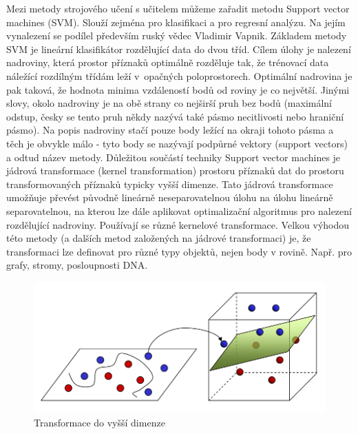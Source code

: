 \documentclass[12pt]{article}
\begin{document}
Mezi metody strojového učení s učitelem můžeme zařadit metodu Support vector machines (SVM). Slouží zejména pro klasifikaci a pro regresní analýzu. Na jejím vynalezení se podílel především ruský vědec Vladimir Vapnik.
Základem metody SVM je lineární klasifikátor rozdělující data do dvou tříd. Cílem úlohy je nalezení nadroviny, která prostor příznaků optimálně rozděluje tak, že trénovací data náležící rozdílným třídám leží v~opačných poloprostorech. Optimální nadrovina je pak taková, že hodnota minima vzdáleností bodů od roviny je co největší. Jinými slovy, okolo nadroviny je na obě strany co nejširší pruh bez bodů (maximální odstup, česky se tento pruh někdy nazývá také pásmo necitlivosti nebo hraniční pásmo). Na popis nadroviny stačí pouze body ležící na okraji tohoto pásma a těch je obvykle málo - tyto body se nazývají podpůrné vektory (support vectors) a odtud název metody.
\newline
\indent
Důležitou součástí techniky Support vector machines je jádrová transformace (kernel transformation) prostoru příznaků dat do prostoru transformovaných příznaků typicky vyšší dimenze. Tato jádrová transformace umožňuje převést původně lineárně neseparovatelnou úlohu na úlohu lineárně separovatelnou, na kterou lze dále aplikovat optimalizační algoritmus pro nalezení rozdělující nadroviny. Používají se různé kernelové transformace. 
Velkou výhodou této metody (a dalších metod založených na jádrové transformaci) je, že transformaci lze definovat pro různé typy objektů, nejen body v rovině. Např. pro grafy, stromy, posloupnosti DNA. \citep{schol}
\begin{figure}[!hbt]
  \centering
  \includegraphics[scale=0.4]{img/svm.png}
  \caption{Transformace do vyšší dimenze}
\end{figure}
\end{document}
